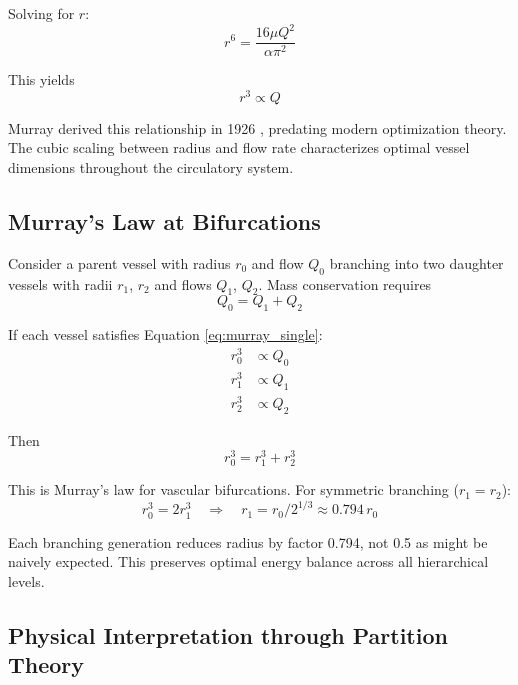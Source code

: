\documentclass[12pt,a4paper]{article}
\theoremstyle{remark}
\begin{document}
Solving for $r$:
\begin{equation}
r^{6} = \frac{16\mu Q^{2}}{\alpha \pi^{2}}
\end{equation}

This yields
\begin{equation}
r^{3} \propto Q
\label{eq:murray_single}
\end{equation}

Murray derived this relationship in 1926 \cite{murray1926physiological}, predating modern optimization theory. The cubic scaling between radius and flow rate characterizes optimal vessel dimensions throughout the circulatory system.

\subsection{Murray's Law at Bifurcations}

Consider a parent vessel with radius $r_{0}$ and flow $Q_{0}$ branching into two daughter vessels with radii $r_{1}$, $r_{2}$ and flows $Q_{1}$, $Q_{2}$. Mass conservation requires
\begin{equation}
Q_{0} = Q_{1} + Q_{2}
\end{equation}

If each vessel satisfies Equation \ref{eq:murray_single}:
\begin{align}
r_{0}^{3} &\propto Q_{0} \\
r_{1}^{3} &\propto Q_{1} \\
r_{2}^{3} &\propto Q_{2}
\end{align}

Then
\begin{equation}
r_{0}^{3} = r_{1}^{3} + r_{2}^{3}
\label{eq:murray_bifurcation}
\end{equation}

This is Murray's law for vascular bifurcations. For symmetric branching ($r_{1} = r_{2}$):
\begin{equation}
r_{0}^{3} = 2r_{1}^{3} \quad \Rightarrow \quad r_{1} = r_{0}/2^{1/3} \approx 0.794 \, r_{0}
\end{equation}

Each branching generation reduces radius by factor 0.794, not 0.5 as might be naively expected. This preserves optimal energy balance across all hierarchical levels.

\subsection{Physical Interpretation through Partition Theory}
\end{document}
